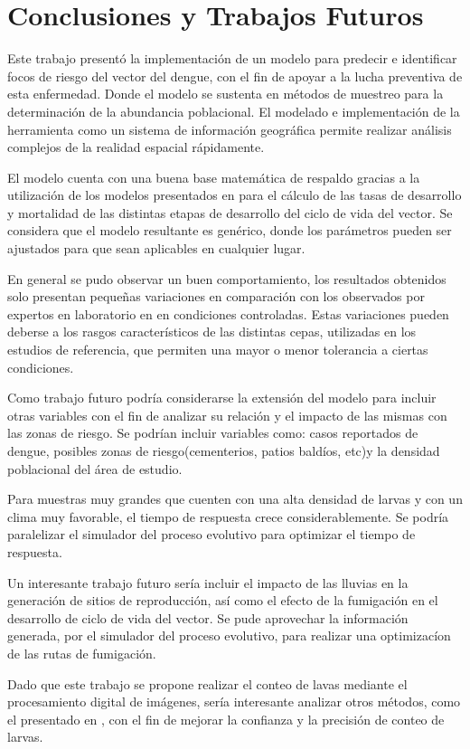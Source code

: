 \chapter{Conclusiones y Trabajos Futuros}
Este trabajo presentó la implementación de un modelo para predecir e identificar focos de riesgo
del vector del dengue, con el fin de apoyar a la lucha preventiva de esta enfermedad. Donde el
modelo se sustenta en métodos de muestreo para la determinación de la abundancia poblacional. El
modelado e implementación de la herramienta como un sistema de información geográfica permite
realizar análisis complejos de la realidad espacial rápidamente.

El modelo cuenta con una buena base matemática de respaldo gracias a la utilización de los modelos
presentados en \cite{sharpe1977reaction, schoolfield1981non, otero2006stochastic} para el
cálculo de las tasas de desarrollo y mortalidad de las distintas etapas de desarrollo del ciclo de
vida del vector. Se considera que el modelo resultante es genérico, donde los parámetros pueden ser
ajustados para que sean aplicables en cualquier lugar.

En general se pudo observar un buen comportamiento, los resultados obtenidos solo presentan
pequeñas variaciones en comparación con los observados por expertos en laboratorio en en
condiciones controladas. Estas variaciones pueden deberse a los rasgos característicos de las
distintas cepas, utilizadas en los estudios de referencia, que permiten una mayor o menor
tolerancia a ciertas condiciones.


Como trabajo futuro podría considerarse la extensión del modelo para incluir otras variables
con el fin de analizar su relación y el impacto de las mismas con las zonas de riesgo. Se podrían
incluir variables como: casos reportados de dengue, posibles zonas de riesgo(cementerios, patios
baldíos, etc)y la densidad poblacional del área de estudio.

Para muestras muy grandes que cuenten con una alta densidad de larvas y con un clima muy
favorable, el tiempo de respuesta crece considerablemente. Se podría paralelizar el simulador del
proceso evolutivo para optimizar el tiempo de respuesta.

Un interesante trabajo futuro sería incluir el impacto de las lluvias en la generación de sitios
de reproducción, así como el efecto de la fumigación en el desarrollo de ciclo de vida del vector.
Se pude aprovechar la información generada, por el simulador del proceso evolutivo, para realizar
una optimizacíon de las rutas de fumigación.

Dado que este trabajo se propone realizar el conteo de lavas mediante el procesamiento digital de
imágenes, sería interesante analizar otros métodos, como el presentado en
\cite{gonzalez2008segmentacion}, con el fin de mejorar la confianza y la precisión de conteo de
larvas.
